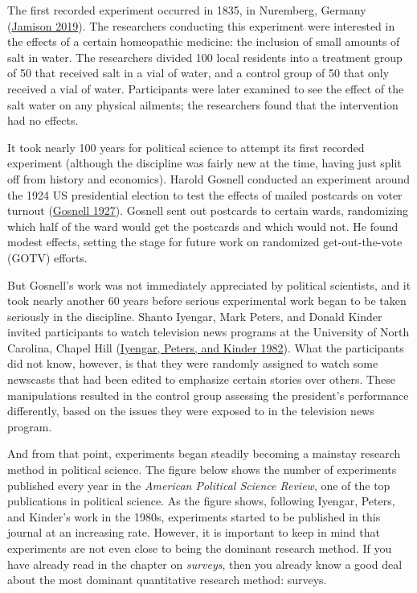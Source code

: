 \documentclass{book}
\begin{document}
The first recorded experiment occurred in 1835, in Nuremberg, Germany
(\protect\hyperlink{ref-jamison_entry_2019}{Jamison 2019}). The researchers
conducting this experiment were interested in the effects of a certain
homeopathic medicine: the inclusion of small amounts of salt in water. The
researchers divided 100 local residents into a treatment group of 50 that
received salt in a vial of water, and a control group of 50 that only received
a vial of water. Participants were later examined to see the effect of the
salt water on any physical ailments; the researchers found that the
intervention had no effects.

It took nearly 100 years for political science to attempt its first recorded
experiment (although the discipline was fairly new at the time, having just
split off from history and economics). Harold Gosnell conducted an experiment
around the 1924 US presidential election to test the effects of mailed
postcards on voter turnout
(\protect\hyperlink{ref-gosnell_getting_1927}{Gosnell 1927}). Gosnell sent out
postcards to certain wards, randomizing which half of the ward would get the
postcards and which would not. He found modest effects, setting the stage for
future work on randomized get-out-the-vote (GOTV) efforts.

But Gosnell's work was not immediately appreciated by political scientists,
and it took nearly another 60 years before serious experimental work began to
be taken seriously in the discipline. Shanto Iyengar, Mark Peters, and Donald
Kinder invited participants to watch television news programs at the
University of North Carolina, Chapel Hill
(\protect\hyperlink{ref-iyengar_experimental_1982}{Iyengar, Peters, and Kinder
1982}). What the participants did not know, however, is that they were
randomly assigned to watch some newscasts that had been edited to emphasize
certain stories over others. These manipulations resulted in the control group
assessing the president's performance differently, based on the issues they
were exposed to in the television news program.

And from that point, experiments began steadily becoming a mainstay research
method in political science. The figure below shows the number of experiments
published every year in the \emph{American Political Science Review}, one of
the top publications in political science. As the figure shows, following
Iyengar, Peters, and Kinder's work in the 1980s, experiments started to be
published in this journal at an increasing rate. However, it is important to
keep in mind that experiments are not even close to being the dominant
research method. If you have already read in the chapter on \emph{surveys},
then you already know a good deal about the most dominant quantitative
research method: surveys.
\end{document}
